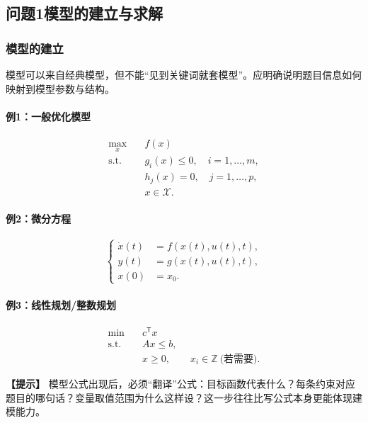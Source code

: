 \documentclass[12pt,a4paper]{article}
\newcommand{\tip}[1]{\par\noindent\textbf{【提示】} #1\par}
\begin{document}
\subsection{问题1模型的建立与求解}

\subsubsection{模型的建立}

模型可以来自经典模型，但不能“见到关键词就套模型”。应明确说明题目信息如何映射到模型参数与结构。

\paragraph{例1：一般优化模型}
\begin{equation}
\begin{aligned}
\max_{x}\quad & f(x)\\
\text{s.t.}\quad & g_i(x)\le 0,\quad i=1,\ldots,m,\\
& h_j(x)=0,\quad j=1,\ldots,p,\\
& x\in\mathcal X.
\end{aligned}
\end{equation}

\paragraph{例2：微分方程}
\begin{equation}
\left\{
\begin{aligned}
\dot{x}(t)&=f(x(t),u(t),t),\\
 y(t)&=g(x(t),u(t),t),\\
 x(0)&=x_0.
\end{aligned}
\right.
\end{equation}

\paragraph{例3：线性规划/整数规划}
\begin{equation}
\begin{aligned}
\min\quad & c^{\mathsf T}x\\
\text{s.t.}\quad & Ax\le b,\\
& x\ge0,\qquad x_i\in\mathbb Z\ \text{(若需要)}.
\end{aligned}
\end{equation}

\tip{模型公式出现后，必须“翻译”公式：目标函数代表什么？每条约束对应题目的哪句话？变量取值范围为什么这样设？这一步往往比写公式本身更能体现建模能力。}
\end{document}

